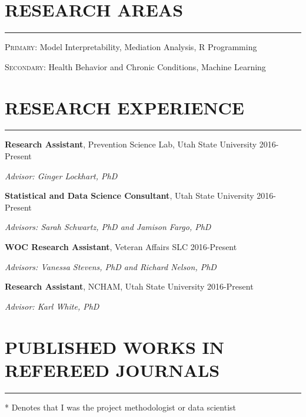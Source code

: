 \documentclass[]{DissertateUSU}
\begin{document}
\vspace{20pt} \tocless\section{RESEARCH AREAS} \vspace{-10pt} \hrule
\vspace{10pt} \hspace{.5in} \small\textsc{Primary:} Model
Interpretability, Mediation Analysis, R Programming

\hspace{.5in} \textsc{Secondary:} Health Behavior and Chronic
Conditions, Machine Learning

\normalsize

\vspace{20pt} \tocless\section{RESEARCH EXPERIENCE} \vspace{-10pt}
\hrule
\vspace{10pt}

\hspace{.5in} \small\textbf{Research Assistant}, Prevention Science Lab,
Utah State University \hfill 2016-Present

\hspace{1in} \emph{Advisor: Ginger Lockhart, PhD}

\hspace{.5in} \small\textbf{Statistical and Data Science Consultant},
Utah State University \hfill 2016-Present

\hspace{1in} \emph{Advisors: Sarah Schwartz, PhD and Jamison Fargo, PhD}

\hspace{.5in} \small\textbf{WOC Research Assistant}, Veteran Affairs SLC
\hfill 2016-Present

\hspace{1in}
\emph{Advisors: Vanessa Stevens, PhD and Richard Nelson, PhD}

\hspace{.5in} \small\textbf{Research Assistant}, NCHAM, Utah State
University \hfill 2016-Present

\hspace{1in} \emph{Advisor: Karl White, PhD}

\vspace{20pt} \tocless\section{PUBLISHED WORKS IN REFEREED JOURNALS}
\vspace{-10pt} \hrule
\hspace{.1in}\footnotesize{* Denotes that I was the project methodologist or data scientist}
\end{document}
